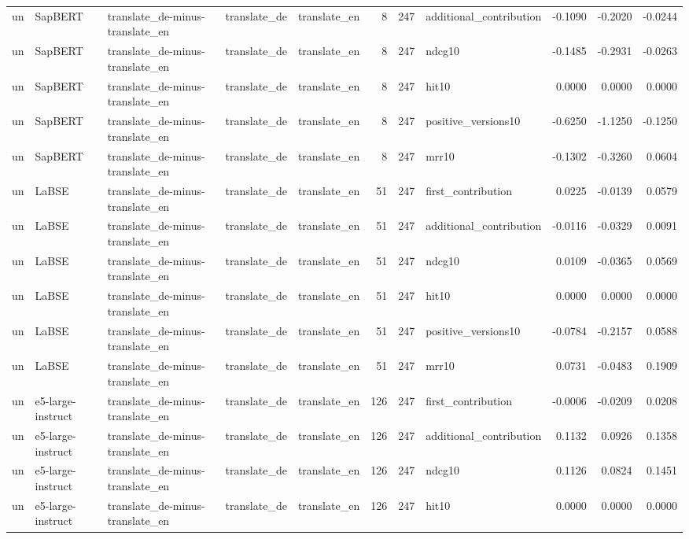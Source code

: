 \begin{tabular}{lllllrrlrrr}
un & SapBERT & translate\_de-minus-translate\_en & translate\_de & translate\_en & 8 & 247 & additional\_contribution & -0.1090 & -0.2020 & -0.0244 \\
un & SapBERT & translate\_de-minus-translate\_en & translate\_de & translate\_en & 8 & 247 & ndcg10 & -0.1485 & -0.2931 & -0.0263 \\
un & SapBERT & translate\_de-minus-translate\_en & translate\_de & translate\_en & 8 & 247 & hit10 & 0.0000 & 0.0000 & 0.0000 \\
un & SapBERT & translate\_de-minus-translate\_en & translate\_de & translate\_en & 8 & 247 & positive\_versions10 & -0.6250 & -1.1250 & -0.1250 \\
un & SapBERT & translate\_de-minus-translate\_en & translate\_de & translate\_en & 8 & 247 & mrr10 & -0.1302 & -0.3260 & 0.0604 \\
un & LaBSE & translate\_de-minus-translate\_en & translate\_de & translate\_en & 51 & 247 & first\_contribution & 0.0225 & -0.0139 & 0.0579 \\
un & LaBSE & translate\_de-minus-translate\_en & translate\_de & translate\_en & 51 & 247 & additional\_contribution & -0.0116 & -0.0329 & 0.0091 \\
un & LaBSE & translate\_de-minus-translate\_en & translate\_de & translate\_en & 51 & 247 & ndcg10 & 0.0109 & -0.0365 & 0.0569 \\
un & LaBSE & translate\_de-minus-translate\_en & translate\_de & translate\_en & 51 & 247 & hit10 & 0.0000 & 0.0000 & 0.0000 \\
un & LaBSE & translate\_de-minus-translate\_en & translate\_de & translate\_en & 51 & 247 & positive\_versions10 & -0.0784 & -0.2157 & 0.0588 \\
un & LaBSE & translate\_de-minus-translate\_en & translate\_de & translate\_en & 51 & 247 & mrr10 & 0.0731 & -0.0483 & 0.1909 \\
un & e5-large-instruct & translate\_de-minus-translate\_en & translate\_de & translate\_en & 126 & 247 & first\_contribution & -0.0006 & -0.0209 & 0.0208 \\
un & e5-large-instruct & translate\_de-minus-translate\_en & translate\_de & translate\_en & 126 & 247 & additional\_contribution & 0.1132 & 0.0926 & 0.1358 \\
un & e5-large-instruct & translate\_de-minus-translate\_en & translate\_de & translate\_en & 126 & 247 & ndcg10 & 0.1126 & 0.0824 & 0.1451 \\
un & e5-large-instruct & translate\_de-minus-translate\_en & translate\_de & translate\_en & 126 & 247 & hit10 & 0.0000 & 0.0000 & 0.0000 \\

\end{tabular}

